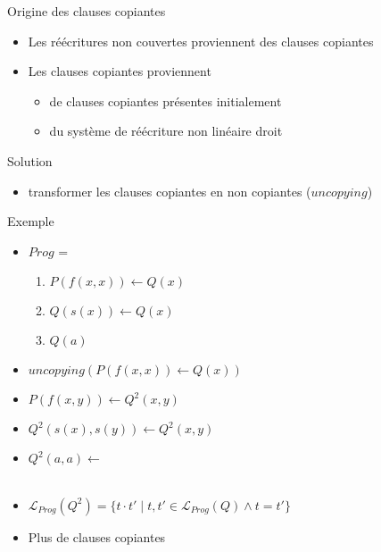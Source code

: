 \begin{frame}{Origine des clauses copiantes}
  \begin{itemize}[<+->]
  \item Les réécritures non couvertes proviennent des clauses copiantes
  \item Les clauses copiantes proviennent
    \begin{itemize}
    \item de clauses copiantes présentes initialement
    \item du système de réécriture non linéaire droit
    \end{itemize}
  \end{itemize}
  \vspace{\baselineskip}
  \begin{block}{}
    Solution
    \begin{itemize}[<+(1)->]
    \item transformer les clauses copiantes en non copiantes ($uncopying$)
    \end{itemize}
  \end{block}
\end{frame}

\begin{frame}{Exemple}
  \begin{itemize}[<+->]
  \item $Prog$ =
    \begin{enumerate}
    \item $P(f(x,x)) \leftarrow Q(x)$
    \item {}$Q(s(x)) \leftarrow Q(x)$
    \item {}$Q(a) $
    \end{enumerate}
    \vspace{\baselineskip}

  \item $uncopying(P(f(x,x)) \leftarrow Q(x))$
  \item $P(f(x,y)) \leftarrow Q^2(x, y)$
  \item $Q^2(s(x),s(y)) \leftarrow Q^2(x,y)$
  \item $Q^2(a,a) \leftarrow $ \\~

  \item $\mathcal{L}_{Prog}(Q^2) = \{t \cdot t' \mid t,t' \in \mathcal{L}_{Prog}(Q) \wedge t = t'\}$
  \item Plus de clauses copiantes
  \end{itemize}
    
\end{frame}


